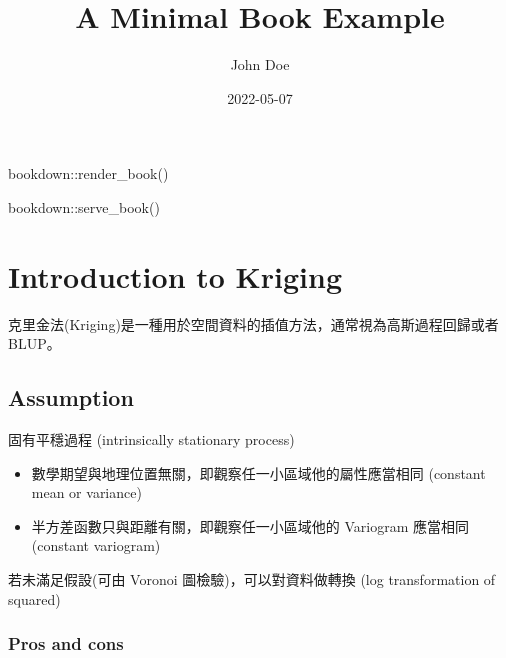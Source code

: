 \documentclass[
]{book}
\title{A Minimal Book Example}
\author{John Doe}
\date{2022-05-07}
\newenvironment{Shaded}{\begin{snugshade}}{\end{snugshade}}
\newcommand{\FunctionTok}[1]{\textcolor[rgb]{0.00,0.00,0.00}{#1}}
\newcommand{\NormalTok}[1]{#1}
\newcommand{\SpecialCharTok}[1]{\textcolor[rgb]{0.00,0.00,0.00}{#1}}
\providecommand{\tightlist}{%
  \setlength{\itemsep}{0pt}\setlength{\parskip}{0pt}}
\begin{document}
\maketitle

{
\setcounter{tocdepth}{1}
\tableofcontents
}
\begin{Shaded}
\begin{Highlighting}[]
\NormalTok{bookdown}\SpecialCharTok{::}\FunctionTok{render\_book}\NormalTok{()}
\end{Highlighting}
\end{Shaded}

\begin{Shaded}
\begin{Highlighting}[]
\NormalTok{bookdown}\SpecialCharTok{::}\FunctionTok{serve\_book}\NormalTok{()}
\end{Highlighting}
\end{Shaded}

\hypertarget{introduction-to-kriging}{%
\chapter{Introduction to Kriging}\label{introduction-to-kriging}}

克里金法(Kriging)是一種用於空間資料的插值方法，通常視為高斯過程回歸或者 BLUP。

\hypertarget{assumption}{%
\section{Assumption}\label{assumption}}

固有平穩過程 (intrinsically stationary process)

\begin{itemize}
\tightlist
\item
  數學期望與地理位置無關，即觀察任一小區域他的屬性應當相同 (constant mean or variance)
\item
  半方差函數只與距離有關，即觀察任一小區域他的 Variogram 應當相同 (constant variogram)
\end{itemize}

若未滿足假設(可由 Voronoi 圖檢驗)，可以對資料做轉換 (log transformation of squared)

\hypertarget{pros-and-cons}{%
\subsection*{Pros and cons}\label{pros-and-cons}}
\end{document}
